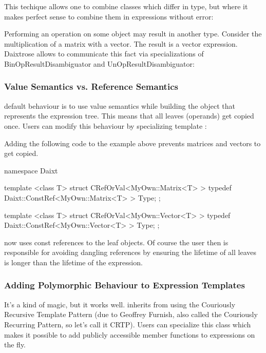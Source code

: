 This techique allows one to combine classes 
which differ in type, but where it makes perfect sense to combine them in
expressions without error:


Performing an operation on some object may result in another type. Consider the
multiplication of a matrix with a vector. The result is a vector expression.
Daixtrose allows to communicate this fact via specializations of
BinOpResultDisambiguator and UnOpResultDisambiguator:


\subsubsection{Value Semantics vs. Reference Semantics}

\Daixtrose default behaviour is to use value semantics while building the object
that represents the expression tree. This means that all leaves (operands) get
copied once. Users can modify this behaviour by specializing
template :

Adding the following code to the example above prevents matrices and vectors to
get copied.  
\begin{code}
namespace Daixt 
{

template <class T>
struct CRefOrVal<MyOwn::Matrix<T> > 
{
  typedef Daixt::ConstRef<MyOwn::Matrix<T> > Type;
};

template <class T>
struct CRefOrVal<MyOwn::Vector<T> > 
{
  typedef Daixt::ConstRef<MyOwn::Vector<T> > Type;
};

}
\end{code}

\Daixtrose now uses const references to the leaf objects. Of course
the user then is responsible for avoiding dangling references by ensuring
the lifetime of all leaves is longer than the lifetime of the expression.


\subsubsection{Adding Polymorphic Behaviour to Expression Templates}

It's a kind of magic, but it works well.
 inherits from  using
the Couriously Recursive Template Pattern (due to Geoffrey Furnish, also called
the Couriously Recurring Pattern, so let's call it CRTP). Users can specialize
this class which makes it possible to add publicly accessible member functions to
expressions on the fly.

